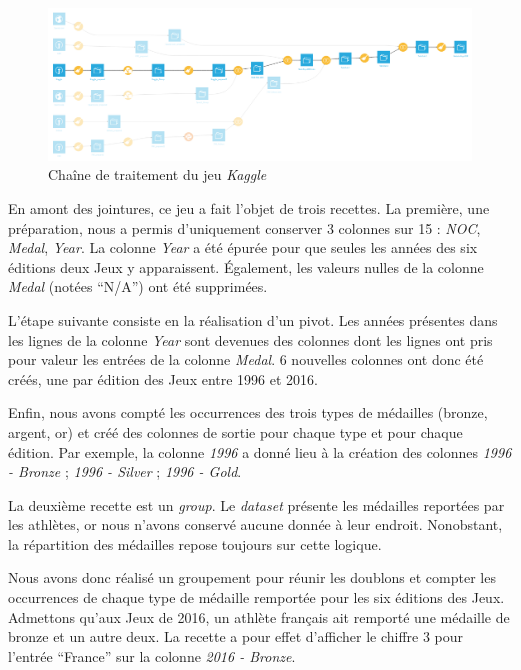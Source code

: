 \documentclass[hidelinks, 12pt]{report}
\begin{document}
\begin{center}
	\begin{figure}[H]
		\setlength{\belowcaptionskip}{-35pt}
		\includegraphics[scale=0.35]{images/flow-medals-kaggle.png}
		\caption{Chaîne de traitement du jeu \textit{Kaggle}}
	\end{figure}
\end{center}

En amont des jointures, ce jeu a fait l'objet de trois recettes. La première, une préparation, nous a permis d'uniquement conserver 3 colonnes sur 15 : \textit{NOC}, \textit{Medal}, \textit{Year}. La colonne \textit{Year} a été épurée pour que seules les années des six éditions deux Jeux y apparaissent. Également, les valeurs nulles de la colonne \textit{Medal} (notées \enquote{N/A}) ont été supprimées.

L'étape suivante consiste en la réalisation d'un pivot. Les années présentes dans les lignes de la colonne \textit{Year} sont devenues des colonnes dont les lignes ont pris pour valeur les entrées de la colonne \textit{Medal}. 6 nouvelles colonnes ont donc été créés, une par édition des Jeux entre 1996 et 2016.

Enfin, nous avons compté les occurrences des trois types de médailles (bronze, argent, or) et créé des colonnes de sortie pour chaque type et pour chaque édition. Par exemple, la colonne \emph{1996} a donné lieu à la création des colonnes \emph{1996 - Bronze} ; \emph{1996 - Silver} ; \emph{1996 - Gold}.

La deuxième recette est un \emph{group}. Le \emph{dataset} présente les médailles reportées par les athlètes, or nous n'avons conservé aucune donnée à leur endroit. Nonobstant, la répartition des médailles repose toujours sur cette logique.

Nous avons donc réalisé un groupement pour réunir les doublons et compter les occurrences de chaque type de médaille remportée pour les six éditions des Jeux. Admettons qu'aux Jeux de 2016, un athlète français ait remporté une médaille de bronze et un autre deux. La recette a pour effet d'afficher le chiffre 3 pour l'entrée \enquote{France} sur la colonne \emph{2016 - Bronze}.
\end{document}
